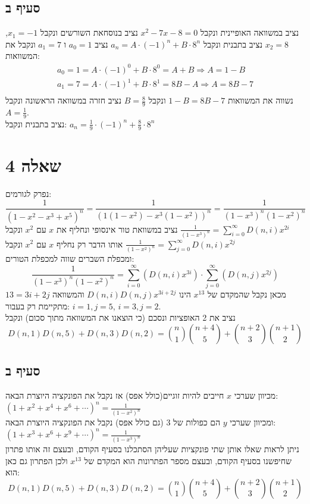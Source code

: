 \documentclass{article}
\begin{document}
	\subsection*{סעיף ב}
	נציב במשוואה האופיינית ונקבל $x^2 - 7x - 8 = 0$ נציב בנוסחאת השורשים ונקבל $x_1 = -1$, $x_2 = 8$
	נציב בתבנית ונקבל $a_n = A \cdot (-1)^n + B \cdot 8^n$ נציב $a_0 = 1$ ו $a_1 = 7$ ונקבל את המשוואות:
	\begin{align}
		a_0 = 1 = A \cdot (-1)^0 + B \cdot 8^0 = A + B \Rightarrow A = 1 - B \\
		a_1 = 7 = A \cdot (-1)^1 + B \cdot 8^1 = 8B - A \Rightarrow A = 8B - 7 \\
	\end{align}
	נשווה את המשוואות $1 - B = 8B - 7$ ונקבל $B=\frac{8}{9}$ נציב חזרה במשוואה הראשונה ונקבל $A=\frac{1}{9}$. \\
	נציב בתבנית ונקבל: $a_n = \frac{1}{9} \cdot (-1)^n + \frac{8}{9} \cdot 8^n$

	\pagebreak
	\section*{שאלה 4}
	נפרק לגורמים:
	\[
	\frac{1}{(1-x^2-x^3+x^5)^n} = \frac{1}{(1(1-x^2)-x^3(1-x^2))^n} = \frac{1}{(1-x^3)^n(1-x^2)^n}
	\]
	נציב במשוואת טור אינסופי ונחליף את $x$ עם $x^2$ ונקבל $\frac{1}{(1-x^3)^n} = \sum_{i=0}^\infty D(n, i)x^{2i}$ \\
	אותו הדבר רק נחליף $x$ עם $x^2$ ונקבל $\frac{1}{(1-x^2)^n} = \sum_{j=0}^\infty D(n, i)x^{2j}$ \\
	ומכפלת השברים שווה למכפלת הטורים:
	\[
		\frac{1}{(1-x^3)^n(1-x^2)^n} = \sum_{i=0}^\infty (D(n, i)x^{3i}) \cdot \sum_{j=0}^\infty (D(n, j)x^{2j})
	\]
	מכאן נקבל שהמקדם של $x^{13}$ הינו $D(n, i)D(n, j)x^{3i + 2j}$ והמשוואה $13 = 3i + 2j$ מתקיימת רק בעבור: $i=1, j = 5$, $i=3, j = 2$. \\
	נציב את 2 האופציות ונסכם (כי הוצאנו את המשוואה מתוך סכום) ונקבל
	\[ D(n, 1)D(n, 5) + D(n, 3)D(n, 2) = {n \choose 1}{n + 4 \choose 5} + {n + 2 \choose 3}{n + 1 \choose 2} \]

	\subsection*{סעיף ב}
	מכיוון שערכי $x$ חייבים להיות זוגיים(כולל אפס) אז נקבל את הפונקציה היוצרת הבאה: $(1 + x^2 + x^4 + x^6 + \cdots)^n = \frac{1}{(1-x^2)^n}$ \\
	ומכיוון שערכי $y$ הם כפולות של 3 (גם כולל אפס) נקבל את הפונקציה היוצרת הבאה: $(1 + x^3 + x^6 + x^9 + \cdots)^n = \frac{1}{(1-x^3)^n}$ \\
	ניתן לראות שאלו אותן שתי פונקציות שעליהן הסתכלנו בסעיף הקודם, ובעצם זה אותו פתרון שחיפשנו בסעיף הקודם, ובעצם מספר הפתרונות הוא המקדם של $x^{13}$ ולכן הפתרון גם כאן הוא:
	\[ D(n, 1)D(n, 5) + D(n, 3)D(n, 2) = {n \choose 1}{n + 4 \choose 5} + {n + 2 \choose 3}{n + 1 \choose 2} \]
\end{document}

